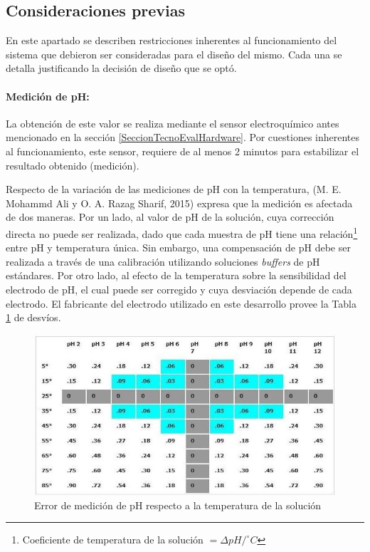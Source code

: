     \subsection{Consideraciones previas}
        \par En este apartado se describen restricciones inherentes al funcionamiento del sistema que debieron ser consideradas para el diseño del mismo. Cada una se detalla justificando la decisión de diseño que se optó.
        
        \paragraph{Medición de pH:} 
            La obtención de este valor se realiza mediante el sensor electroquímico antes mencionado en la sección \ref{SeccionTecnoEvalHardware}. Por cuestiones inherentes al funcionamiento, este sensor, requiere de al menos 2 minutos para estabilizar el resultado obtenido (medición).
            
            \par Respecto de la variación de las mediciones de pH con la temperatura, (M. E. Mohammd Ali y O. A. Razag Sharif, 2015) expresa que la medición es afectada de dos maneras. Por un lado, al valor de pH de la solución, cuya corrección directa no puede ser realizada, dado que cada muestra de pH tiene una relación\footnote{Coeficiente de temperatura de la solución  $ = \Delta pH/ ^{\circ}C $} entre pH y temperatura única. Sin embargo, una compensación de pH debe ser realizada a través de una calibración utilizando soluciones \textit{buffers} de pH estándares. Por otro lado, al efecto de la temperatura sobre la sensibilidad del electrodo de pH, el cual puede ser corregido y cuya desviación depende de cada electrodo. El fabricante del electrodo utilizado en este desarrollo provee la Tabla \ref{tablePhvsTemp} de desvíos. 
            
            \begin{figure}[h] 
                \centering
                \includegraphics[scale=0.9]{errorMedicionPh.jpg}
                \caption{Error de medición de pH respecto a la temperatura de la solución}
                \label{tablePhvsTemp}
            \end{figure}
            
